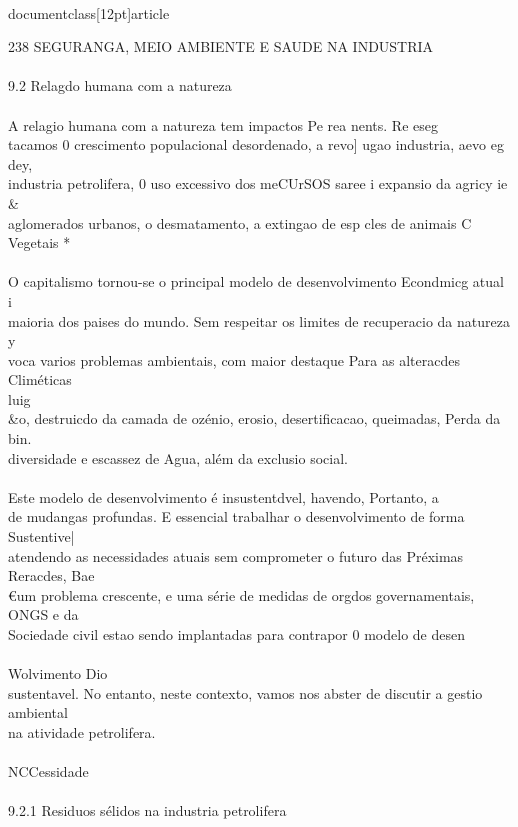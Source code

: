 \\documentclass[12pt]{article}
\begin{document}
238 SEGURANGA, MEIO AMBIENTE E SAUDE NA INDUSTRIA\\
\\
9.2 Relagdo humana com a natureza\\
\\
A relagio humana com a natureza tem impactos Pe rea nents. Re eseg\\
tacamos 0 crescimento populacional desordenado, a revo] ugao industria, aevo eg dey,\\
industria petrolifera, 0 uso excessivo dos meCUrSOS saree i expansio da agricy ie \\&\\
aglomerados urbanos, o desmatamento, a extingao de esp cles de animais C Vegetais *\\
\\
O capitalismo tornou-se o principal modelo de desenvolvimento Econdmicg atual i\\
maioria dos paises do mundo. Sem respeitar os limites de recuperacio da natureza y\\
voca varios problemas ambientais, com maior destaque Para as alteracdes Climéticas\\
luig\\&o, destruicdo da camada de ozénio, erosio, desertificacao, queimadas, Perda da bin.\\
diversidade e escassez de Agua, além da exclusio social.\\
\\
Este modelo de desenvolvimento é insustentdvel, havendo, Portanto, a\\
de mudangas profundas. E essencial trabalhar o desenvolvimento de forma Sustentive|\\
atendendo as necessidades atuais sem comprometer o futuro das Préximas Reracdes, Bae\\
€um problema crescente, e uma série de medidas de orgdos governamentais, ONGS e da\\
Sociedade civil estao sendo implantadas para contrapor 0 modelo de desen\\
\\
Wolvimento Dio\\
sustentavel. No entanto, neste contexto, vamos nos abster de discutir a gestio ambiental\\
na atividade petrolifera.\\
\\
NCCessidade\\
\\
9.2.1 Residuos sélidos na industria petrolifera\\
\end{document}
